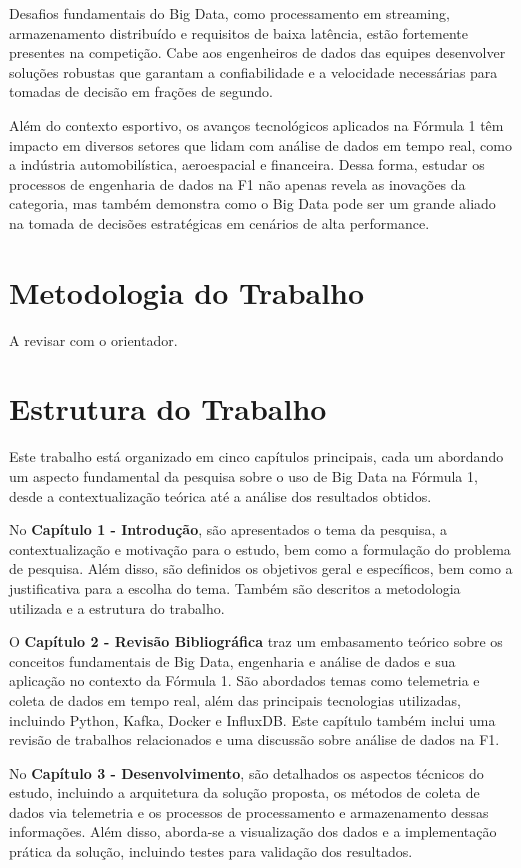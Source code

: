 \documentclass[12pt, %
openright, 
oneside, %
a4paper,    %
brazil]{facom-ufu-abntex2}
\begin{document}
Desafios fundamentais do Big Data, como processamento em streaming, armazenamento distribuído e requisitos de baixa latência, estão fortemente presentes na competição. 
Cabe aos engenheiros de dados das equipes desenvolver soluções robustas que garantam a confiabilidade e a velocidade necessárias para tomadas de decisão em frações de segundo.

Além do contexto esportivo, os avanços tecnológicos aplicados na Fórmula 1 têm impacto em diversos setores que lidam com análise de dados em tempo real, 
como a indústria automobilística, aeroespacial e financeira. Dessa forma, estudar os processos de engenharia de dados na F1 não apenas revela as inovações da categoria, 
mas também demonstra como o Big Data pode ser um grande aliado na tomada de decisões estratégicas em cenários de alta performance.

\section{Metodologia do Trabalho}

A revisar com o orientador.

\section{Estrutura do Trabalho}

Este trabalho está organizado em cinco capítulos principais, cada um abordando um aspecto fundamental da pesquisa sobre o uso de Big Data na Fórmula 1, desde a contextualização 
teórica até a análise dos resultados obtidos.

No \textbf{Capítulo 1 - Introdução}, são apresentados o tema da pesquisa, a contextualização e motivação para o estudo, bem como a formulação do problema de pesquisa. 
Além disso, são definidos os objetivos geral e específicos, bem como a justificativa para a escolha do tema. Também são descritos a metodologia utilizada e a estrutura do trabalho.

O \textbf{Capítulo 2 - Revisão Bibliográfica} traz um embasamento teórico sobre os conceitos fundamentais de Big Data, engenharia e análise de dados e sua aplicação no contexto da Fórmula 1. 
São abordados temas como telemetria e coleta de dados em tempo real, além das principais tecnologias utilizadas, incluindo Python, Kafka, Docker e InfluxDB. Este capítulo também inclui 
uma revisão de trabalhos relacionados e uma discussão sobre análise de dados na F1.

No \textbf{Capítulo 3 - Desenvolvimento}, são detalhados os aspectos técnicos do estudo, incluindo a arquitetura da solução proposta, os métodos de coleta de dados via telemetria e 
os processos de processamento e armazenamento dessas informações. Além disso, aborda-se a visualização dos dados e a implementação prática da solução, incluindo testes para validação dos resultados.
\end{document}
